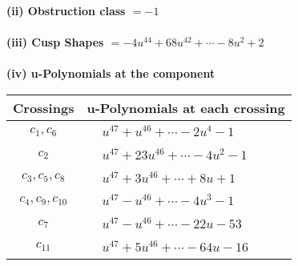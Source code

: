 \documentclass[1p]{elsarticle_modified}
\theoremstyle{definition}
\begin{document}
\flushleft \textbf{(ii) Obstruction class $= -1$}\\~\\
\flushleft \textbf{(iii) Cusp Shapes $= -4 u^{44}+68 u^{42}+\cdots-8 u^2+2$}\\~\\
\newpage\renewcommand{\arraystretch}{1}
\flushleft \textbf{(iv) u-Polynomials at the component}\newline \\
\begin{tabular}{m{50pt}|m{274pt}}
Crossings & \hspace{64pt}u-Polynomials at each crossing \\
\hline $$\begin{aligned}c_{1},c_{6}\end{aligned}$$&$\begin{aligned}
&u^{47}+u^{46}+\cdots-2 u^4-1
\end{aligned}$\\
\hline $$\begin{aligned}c_{2}\end{aligned}$$&$\begin{aligned}
&u^{47}+23 u^{46}+\cdots-4 u^2-1
\end{aligned}$\\
\hline $$\begin{aligned}c_{3},c_{5},c_{8}\end{aligned}$$&$\begin{aligned}
&u^{47}+3 u^{46}+\cdots+8 u+1
\end{aligned}$\\
\hline $$\begin{aligned}c_{4},c_{9},c_{10}\end{aligned}$$&$\begin{aligned}
&u^{47}- u^{46}+\cdots-4 u^3-1
\end{aligned}$\\
\hline $$\begin{aligned}c_{7}\end{aligned}$$&$\begin{aligned}
&u^{47}- u^{46}+\cdots-22 u-53
\end{aligned}$\\
\hline $$\begin{aligned}c_{11}\end{aligned}$$&$\begin{aligned}
&u^{47}+5 u^{46}+\cdots-64 u-16
\end{aligned}$\\
\hline
\end{tabular}\\~\\
\end{document}

